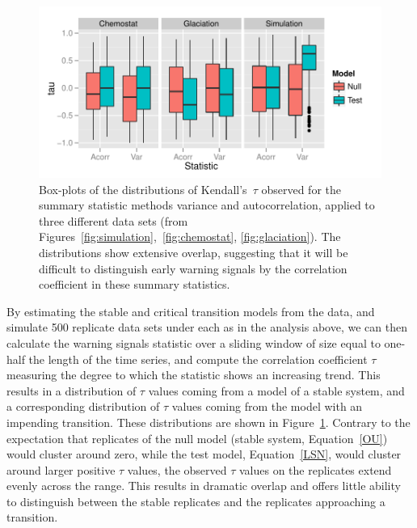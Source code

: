\documentclass[authoryear,review,11pt]{elsarticle}
\begin{document}
 \begin{figure}
   \begin{center}
     \includegraphics[width=\linewidth]{figures/summary_box.pdf}
     \caption{Box-plots of the distributions of Kendall's~$\tau$ observed for the summary statistic methods variance and autocorrelation, applied to three different data sets (from Figures~\ref{fig:simulation},~\ref{fig:chemostat}, \ref{fig:glaciation}).  The distributions show extensive overlap, suggesting that it will be difficult to distinguish early warning signals by the correlation coefficient in these summary statistics.}
     \label{fig:summary_box}
  \end{center}
 \end{figure}



By estimating the stable and critical transition models from the data,
and simulate 500 replicate data sets under each as in the analysis above,
we can then calculate the warning signals statistic over a sliding window
of size equal to one-half the length of the time series,
and compute the correlation coefficient $\tau$ measuring the degree to which the statistic shows an increasing trend.
This results in a distribution of $\tau$ values coming from a model of a stable system,
and a corresponding distribution of $\tau$ values coming from the model with an impending transition.
These distributions are shown in Figure~\ref{fig:summary_box}.
Contrary to the expectation that replicates of the null model (stable system, Equation~\eqref{OU}) would cluster around zero, 
while the test model, Equation~\eqref{LSN}, would cluster around larger positive $\tau$ values, 
the observed $\tau$ values on the replicates extend evenly across the range.  
This results in dramatic overlap and offers little ability to distinguish between the stable replicates 
and the replicates approaching a transition. 
\end{document}
